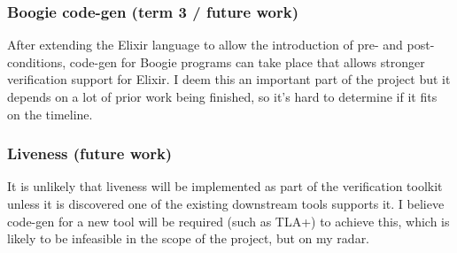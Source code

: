 \subsubsection{Boogie code-gen (term 3 / future work)}
After extending the Elixir language to allow the introduction of pre- and post-conditions, code-gen for Boogie programs can take place that allows stronger verification support for Elixir. I deem this an important part of the project but it depends on a lot of prior work being finished, so it's hard to determine if it fits on the timeline.
\subsubsection{Liveness (future work)}
It is unlikely that liveness will be implemented as part of the verification toolkit unless it is discovered one of the existing downstream tools supports it. I believe code-gen for a new tool will be required (such as TLA+) to achieve this, which is likely to be infeasible in the scope of the project, but on my radar.